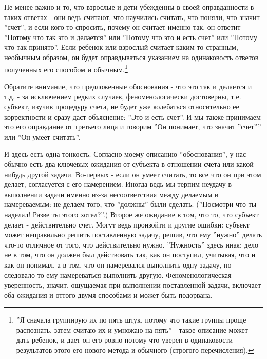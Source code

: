 \documentclass{book}
\begin{document}
Не менее важно и то, что взрослые и дети убежденны в своей оправданности в таких ответах - они ведь считают, что научились считать, что поняли, что значит ''счет'', и если кого-то спросить, почему он считает именно так, он ответит ''Потому что так это и делается'' или ''Потому что это и есть счет'' или ''Потому что так принято''. Если ребенок или взрослый считает каким-то странным, необычным образом, он будет оправдываться указанием на одинаковость ответов полученных его способом и обычным.\footnote{''Я сначала группирую их по пять штук, потому что такие группы проще распознать, затем считаю их и умножаю на пять'' - такое описание может дать ребенок, и дает он его ровно потому что уверен в одинаковости результатов этого его нового метода и обычного (строгого перечисления).}

Обратите внимание, что предложенные обоснования - что это так и делается и т.д. - за исключением редких случаев, феноменологически достоверны, т.е. субъект, изучив процедуру счета, не будет уже колебаться относительно ее корректности и сразу даст объяснение: ''Это и есть счет''. И мы также принимаем это его оправдание от третьего лица и говорим ''Он понимает, что значит ''счет'''' или ''Он умеет считать''.

И здесь есть одна тонкость. Согласно моему описанию ''обоснования'', у нас обычно есть два ключевых ожидания от субъекта в отношении счета или какой-нибудь другой задачи. Во-первых - если он умеет считать, то все что он при этом делает, согласуется с его намерением. Иногда ведь мы терпим неудачу в выполнении задачи именно из-за несоответствия между делаемым и намереваемым: не делаем того, что ''должны'' были сделать. (''Посмотри что ты наделал! Разве ты этого хотел?''.) Второе же ожидание в том, что то, что субъект делает - действительно счет. Могут ведь произойти и другие ошибки: субъект может неправильно решить поставленную задачу, решив, что ему ''нужно'' делать что-то отличное от того, что действительно нужно. ''Нужность'' здесь иная: дело не в том, что он должен был действовать так, как он поступил, учитывая, что и как он понимал, а в том, что он намеревался выполнить одну задачу, но следовало то ему намереваться выполнить другую. Феноменологическая уверенность, значит, ощущаемая при выполнении поставленной задачи, включает оба ожидания и оттого двумя способами и может быть подорвана.
\end{document}
